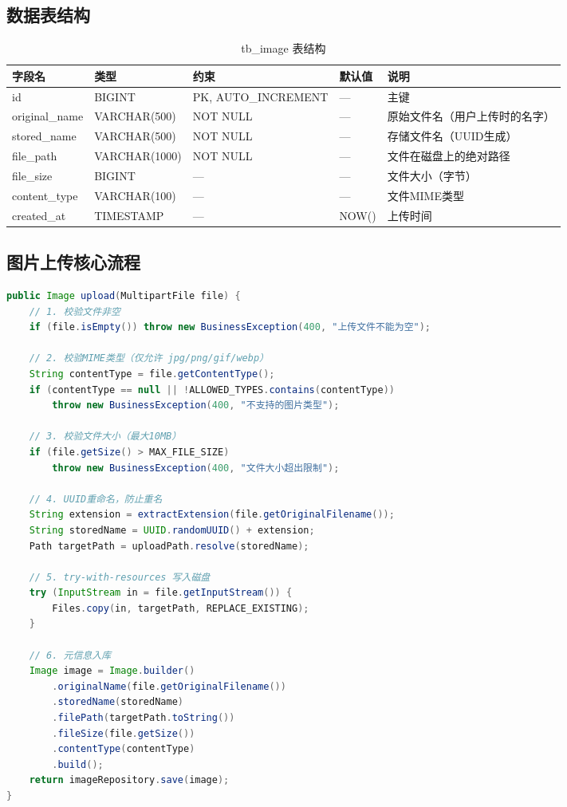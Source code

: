 \documentclass{../../softeng}
\begin{document}
\subsection{数据表结构}

\begin{table}[htbp]
\centering
\caption{tb\_image 表结构}
\label{tab:tb_image}
\begin{tabular}{lllll}
\toprule
\textbf{字段名} & \textbf{类型} & \textbf{约束} & \textbf{默认值} & \textbf{说明} \\
\midrule
id            & BIGINT    & PK, AUTO\_INCREMENT & —      & 主键 \\
original\_name & VARCHAR(500) & NOT NULL        & —      & 原始文件名（用户上传时的名字）\\
stored\_name   & VARCHAR(500) & NOT NULL        & —      & 存储文件名（UUID生成）\\
file\_path     & VARCHAR(1000)& NOT NULL        & —      & 文件在磁盘上的绝对路径 \\
file\_size     & BIGINT    & —                & —      & 文件大小（字节）\\
content\_type  & VARCHAR(100) & —                & —      & 文件MIME类型 \\
created\_at    & TIMESTAMP & —                & NOW()  & 上传时间 \\
\bottomrule
\end{tabular}
\end{table}

\subsection{图片上传核心流程}

\begin{lstlisting}[language=Java,caption={ImageService.upload() 核心流程}]
public Image upload(MultipartFile file) {
    // 1. 校验文件非空
    if (file.isEmpty()) throw new BusinessException(400, "上传文件不能为空");

    // 2. 校验MIME类型（仅允许 jpg/png/gif/webp）
    String contentType = file.getContentType();
    if (contentType == null || !ALLOWED_TYPES.contains(contentType))
        throw new BusinessException(400, "不支持的图片类型");

    // 3. 校验文件大小（最大10MB）
    if (file.getSize() > MAX_FILE_SIZE)
        throw new BusinessException(400, "文件大小超出限制");

    // 4. UUID重命名，防止重名
    String extension = extractExtension(file.getOriginalFilename());
    String storedName = UUID.randomUUID() + extension;
    Path targetPath = uploadPath.resolve(storedName);

    // 5. try-with-resources 写入磁盘
    try (InputStream in = file.getInputStream()) {
        Files.copy(in, targetPath, REPLACE_EXISTING);
    }

    // 6. 元信息入库
    Image image = Image.builder()
        .originalName(file.getOriginalFilename())
        .storedName(storedName)
        .filePath(targetPath.toString())
        .fileSize(file.getSize())
        .contentType(contentType)
        .build();
    return imageRepository.save(image);
}
\end{lstlisting}
\end{document}
